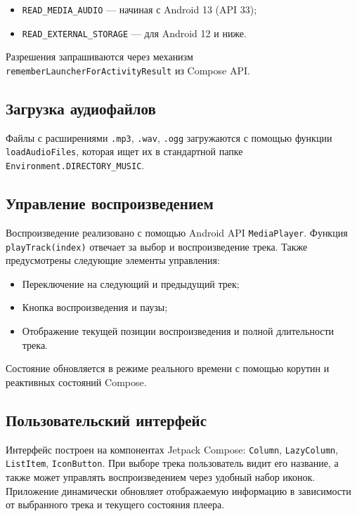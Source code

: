\begin{itemize}
    \item \texttt{READ\_MEDIA\_AUDIO} --- начиная с Android 13 (API 33);
    \item \texttt{READ\_EXTERNAL\_STORAGE} --- для Android 12 и ниже.
\end{itemize}

Разрешения запрашиваются через механизм \texttt{rememberLauncherForActivityResult} из Compose API.

\subsection{Загрузка аудиофайлов}

Файлы с расширениями \texttt{.mp3}, \texttt{.wav}, \texttt{.ogg} загружаются с помощью функции \texttt{loadAudioFiles}, которая ищет их в стандартной папке \texttt{Environment.DIRECTORY\_MUSIC}.

\subsection{Управление воспроизведением}

Воспроизведение реализовано с помощью Android API \texttt{MediaPlayer}. Функция \texttt{playTrack(index)} отвечает за выбор и воспроизведение трека. Также предусмотрены следующие элементы управления:

\begin{itemize}
    \item Переключение на следующий и предыдущий трек;
    \item Кнопка воспроизведения и паузы;
    \item Отображение текущей позиции воспроизведения и полной длительности трека.
\end{itemize}

Состояние обновляется в режиме реального времени с помощью корутин и реактивных состояний Compose.

\subsection{Пользовательский интерфейс}

Интерфейс построен на компонентах Jetpack Compose: \texttt{Column}, \texttt{LazyColumn}, \texttt{ListItem}, \texttt{IconButton}. При выборе трека пользователь видит его название, а также может управлять воспроизведением через удобный набор иконок. Приложение динамически обновляет отображаемую информацию в зависимости от выбранного трека и текущего состояния плеера.

\newpage
